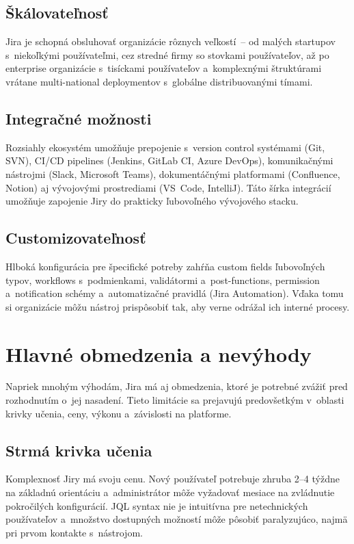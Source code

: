 \subsection{Škálovateľnosť}

Jira je schopná obsluhovať organizácie rôznych veľkostí~-- od malých startupov s~niekoľkými používateľmi, cez stredné firmy so stovkami používateľov, až po enterprise organizácie s~tisíckami používateľov a~komplexnými štruktúrami vrátane multi-national deploymentov s~globálne distribuovanými tímami.

\subsection{Integračné možnosti}

Rozsiahly ekosystém umožňuje prepojenie s~version control systémami (Git, SVN), CI/CD pipelines (Jenkins, GitLab CI, Azure DevOps), komunikačnými nástrojmi (Slack, Microsoft Teams), dokumentáčnými platformami (Confluence, Notion) aj vývojovými prostrediami (VS~Code, IntelliJ). Táto šírka integrácií umožňuje zapojenie Jiry do prakticky ľubovoľného vývojového stacku.

\subsection{Customizovateľnosť}

Hlboká konfigurácia pre špecifické potreby zahŕňa custom fields ľubovoľných typov, workflows s~podmienkami, validátormi a~post-functions, permission a~notification schémy a~automatizačné pravidlá (Jira Automation). Vďaka tomu si organizácie môžu nástroj prispôsobiť tak, aby verne odrážal ich interné procesy.

\section{Hlavné obmedzenia a nevýhody}

Napriek mnohým výhodám, Jira má aj obmedzenia, ktoré je potrebné zvážiť pred rozhodnutím o~jej nasadení. Tieto limitácie sa prejavujú predovšetkým v~oblasti krivky učenia, ceny, výkonu a~závislosti na platforme.

\subsection{Strmá krivka učenia}

Komplexnosť Jiry má svoju cenu. Nový používateľ potrebuje zhruba 2--4 týždne na základnú orientáciu a~administrátor môže vyžadovať mesiace na zvládnutie pokročilých konfigurácií. JQL syntax nie je intuitívna pre netechnických používateľov a~množstvo dostupných možností môže pôsobiť paralyzujúco, najmä pri prvom kontakte s~nástrojom.

